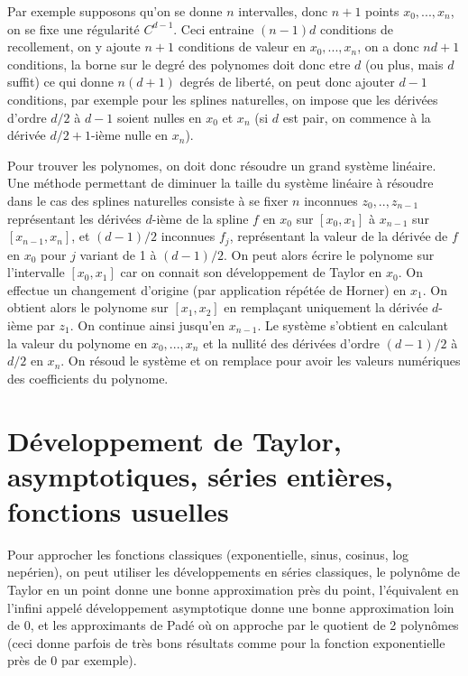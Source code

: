 \documentclass[a4paper,11pt]{article}
\begin{document}
\begin{giacjshere}
Par exemple supposons qu'on se donne $n$ intervalles, donc $n+1$
points $x_0,...,x_n$, on se fixe une régularité $C^{d-1}$. Ceci
entraine $(n-1)d$ conditions de recollement, on y ajoute $n+1$
conditions de valeur en $x_0,...,x_n$, on a donc $nd+1$ conditions,
la borne sur le degré des polynomes doit donc etre $d$ (ou plus,
mais $d$ suffit) ce qui donne $n(d+1)$ degrés de liberté, on
peut donc ajouter $d-1$ conditions, par exemple pour les splines
naturelles, on impose que les dérivées d'ordre $d/2$ à $d-1$
soient nulles en $x_0$ et $x_n$ (si $d$ est pair, on commence à
la dérivée $d/2+1$-ième nulle en $x_n$).

Pour trouver les polynomes, on doit donc résoudre un grand système
linéaire. Une méthode permettant de diminuer la taille du système
linéaire à résoudre dans le cas des splines naturelles
consiste à se fixer $n$ inconnues $z_0,..,z_{n-1}$
représentant les dérivées $d$-ième de la spline $f$ en
$x_0$ sur $[x_0,x_1]$ à $x_{n-1}$ sur $[x_{n-1},x_n]$, 
et $(d-1)/2$ inconnues $f_j$, représentant
la valeur de la dérivée de $f$ en $x_0$ pour $j$ variant
de 1 à $(d-1)/2$. On peut alors écrire le polynome sur l'intervalle
$[x_0,x_1]$ car on connait son développement de Taylor en $x_0$.
On effectue un changement d'origine (par application répétée
de Horner) en $x_1$. On obtient alors le polynome sur $[x_1,x_2]$
en remplaçant uniquement la dérivée $d$-ième par $z_1$.
On continue ainsi jusqu'en $x_{n-1}$. Le système s'obtient en
calculant la valeur du polynome en $x_0,...,x_n$ et la nullité
des dérivées d'ordre $(d-1)/2$ à $d/2$ en $x_n$. On résoud
le système et on remplace pour avoir les valeurs numériques
des coefficients du polynome.


\section{Développement de Taylor, asymptotiques, 
s\'eries enti\`eres, fonctions usuelles}
\label{sec:series}
Pour approcher les fonctions classiques (exponentielle, sinus,
cosinus, log nepérien), on peut utiliser les développements en séries 
classiques, le polyn\^ome de Taylor en un point donne
une bonne approximation pr\`es du point, l'équivalent
en l'infini appelé développement asymptotique donne
une bonne approximation loin de 0, et
les approximants de Pad\'e 
o\`u on approche par le quotient de 2 polyn\^omes (ceci
donne parfois de tr\`es bons r\'esultats comme pour la fonction
exponentielle pr\`es de 0 par exemple).



\end{giacjshere}
\end{document}
